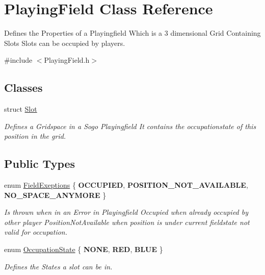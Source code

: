 \hypertarget{classPlayingField}{\section{Playing\-Field Class Reference}
\label{classPlayingField}
}


Defines the Properties of a Playingfield Which is a 3 dimensional Grid Containing Slots Slots can be occupied by players.  




{\ttfamily \#include $<$Playing\-Field.\-h$>$}

\subsection*{Classes}
\begin{DoxyCompactItemize}
\item 
struct \hyperlink{structPlayingField_1_1Slot}{Slot}
\begin{DoxyCompactList}\small\item\em Defines a Gridspace in a Sogo Playingfield It contains the occupationstate of this position in the grid. \end{DoxyCompactList}\end{DoxyCompactItemize}
\subsection*{Public Types}
\begin{DoxyCompactItemize}
\item 
enum \hyperlink{classPlayingField_a6032d4d7297d628a368cde7db331d7f6}{Field\-Exeptions} \{ {\bfseries O\-C\-C\-U\-P\-I\-E\-D}, 
{\bfseries P\-O\-S\-I\-T\-I\-O\-N\-\_\-\-N\-O\-T\-\_\-\-A\-V\-A\-I\-L\-A\-B\-L\-E}, 
{\bfseries N\-O\-\_\-\-S\-P\-A\-C\-E\-\_\-\-A\-N\-Y\-M\-O\-R\-E}
 \}
\begin{DoxyCompactList}\small\item\em Is thrown when in an Error in Playingfield Occupied when already occupied by other player Position\-Not\-Available when position is under current fieldstate not valid for occupation. \end{DoxyCompactList}\item 
enum \hyperlink{classPlayingField_ac6df152a3f820aa04a00ab4df4a9d265}{Occupation\-State} \{ {\bfseries N\-O\-N\-E}, 
{\bfseries R\-E\-D}, 
{\bfseries B\-L\-U\-E}
 \}
\begin{DoxyCompactList}\small\item\em Defines the States a slot can be in. \end{DoxyCompactList}\end{DoxyCompactItemize}
